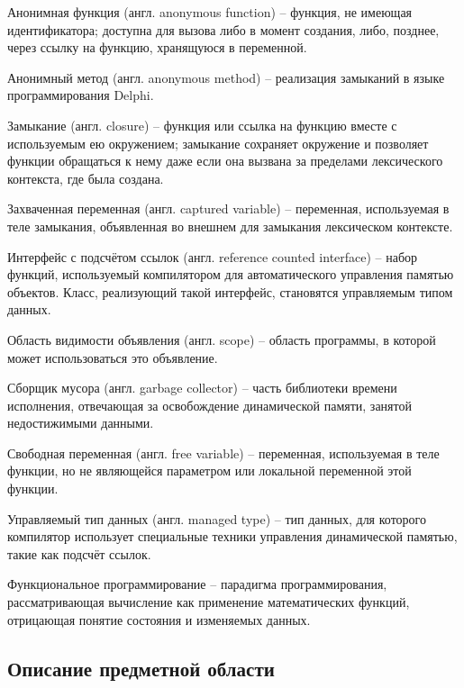 \documentclass{imcs}
\begin{document}
Анонимная функция (англ. anonymous function) -- функция, не имеющая идентификатора; доступна для
вызова либо в момент создания, либо, позднее, через ссылку на функцию,
хранящуюся в переменной.

Анонимный метод (англ. anonymous method) -- реализация замыканий в языке программирования Delphi\cite{anonymmethods}. 

Замыкание (англ. closure) -- функция или ссылка на функцию вместе с используемым ею
окружением; замыкание сохраняет окружение и позволяет функции
обращаться к нему даже если она вызвана за пределами лексического
контекста, где была создана.

Захваченная переменная (англ. captured variable) -- переменная, используемая в теле замыкания,
объявленная во внешнем для замыкания лексическом контексте.

Интерфейс с подсчётом ссылок (англ. reference counted interface) -- набор функций, используемый компилятором для
автоматического управления памятью объектов. Класс, реализующий такой интерфейс,
становятся управляемым типом данных.

Область видимости объявления (англ. scope) -- область программы, в которой может 
использоваться это объявление.

Сборщик мусора (англ. garbage collector) -- часть библиотеки времени исполнения, отвечающая за освобождение
динамической памяти, занятой недостижимыми данными.

Свободная переменная (англ. free variable) -- переменная, используемая в теле функции, но не
являющейся параметром или локальной переменной этой функции.

Управляемый тип данных (англ. managed type) -- тип данных, для которого компилятор
использует специальные техники управления динамической памятью,
такие как подсчёт ссылок\cite{delhpimanged}.

Функциональное программирование -- парадигма программирования,
рассматривающая вычисление как применение математических функций,
отрицающая понятие состояния и изменяемых данных.


\subsection{Описание предметной области}
\end{document}

